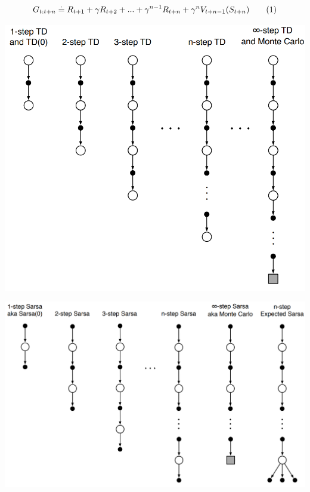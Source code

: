 \documentclass[10pt,landscape]{article}
\newcommand\numberthis{\addtocounter{equation}{1}\tag{\theequation}}
\begin{document}
\begin{multicols}{3}
\begin{equation}
G_{t:t+n}\stackrel{.}{=} R_{t+1} + \gamma R_{t+2} + ... + \gamma^{n-1} R_{t+n} + \gamma^n V_{t+n-1}(S_{t+n}) \numberthis
\end{equation}
\begin{center}
    \includegraphics[width=\linewidth]{images/nstep_backup.png}
\end{center}

\begin{center}
    \includegraphics[width=\linewidth]{images/nstep_sarsa_backup.png}
\end{center}



\end{multicols}
\end{document}
